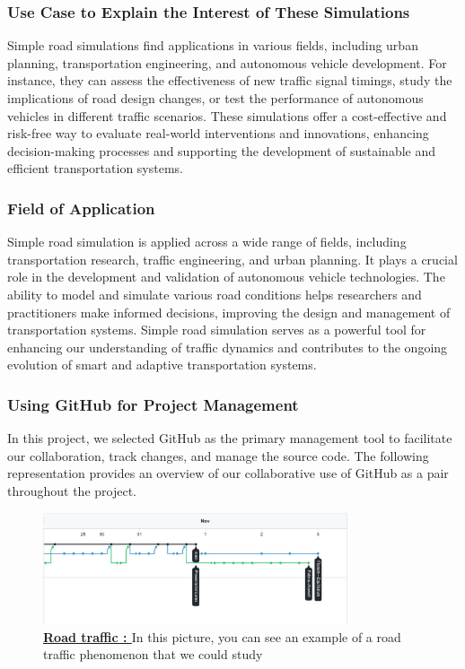 \documentclass{article}
\begin{document}
		\subsubsection{Use Case to Explain the Interest of These Simulations}
		Simple road simulations find applications in various fields, including urban planning, transportation engineering, and autonomous vehicle development. For instance, they can assess the effectiveness of new traffic signal timings, study the implications of road design changes, or test the performance of autonomous vehicles in different traffic scenarios. These simulations offer a cost-effective and risk-free way to evaluate real-world interventions and innovations, enhancing decision-making processes and supporting the development of sustainable and efficient transportation systems.
		
		\subsubsection{Field of Application}
		Simple road simulation is applied across a wide range of fields, including transportation research, traffic engineering, and urban planning. It plays a crucial role in the development and validation of autonomous vehicle technologies. The ability to model and simulate various road conditions helps researchers and practitioners make informed decisions, improving the design and management of transportation systems. Simple road simulation serves as a powerful tool for enhancing our understanding of traffic dynamics and contributes to the ongoing evolution of smart and adaptive transportation systems.
		
	
	\subsubsection{Using GitHub for Project Management}
	In this project, we selected GitHub as the primary management tool to facilitate our collaboration, track changes, and manage the source code. The following representation provides an overview of our collaborative use of GitHub as a pair throughout the project.
	\begin{figure}[H]
		\centering
		\includegraphics[width=0.8\textwidth]{GitHub.jpg}
		\caption[GitHub Branch]{\textbf{\underline{Road traffic : }} In this picture, you can see an example of a road traffic phenomenon that we could study}
		\label{fig:GitHub}
	\end{figure}
	
\end{document}
